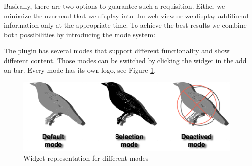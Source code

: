 Basically, there are two options to guarantee such a requisition. Either we minimize the overhead that we display into the web view or we display additional information only at the appropriate time. To achieve the best results we combine both possibilities by introducing the mode system:

The plugin has several modes that support different functionality and show different content. Those modes can be switched by clicking the widget in the add on bar. Every mode has its own logo, see Figure \ref{mode-logos}. 

\begin{figure}\centering
		\includegraphics[width=13cm]{images/mode-logos.png}
		\caption{Widget representation for different modes}
		\label{mode-logos}
\end{figure} 

